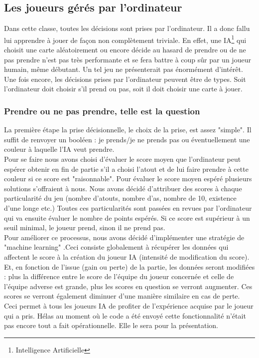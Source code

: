 \documentclass[a4paper,11pt]{article}
\begin{document}
\subsection{Les joueurs gérés par l'ordinateur}
Dans cette classe, toutes les décisions sont prises par l'ordinateur. Il a donc fallu lui apprendre à jouer de façon non complètement triviale. En effet, une IA\footnote{Intelligence Artificielle} qui choisit une carte aléatoirement ou encore décide au hasard de prendre ou de ne pas prendre n'est pas très performante et se fera battre à coup sûr par un joueur humain, même débutant. Un tel jeu ne présenterait pas énormément d'intérêt.\\

Une fois encore, les décisions prises par l'ordinateur peuvent être de types. Soit l'ordinateur doit choisir s'il prend ou pas, soit il doit choisir une carte à jouer. 
\subsubsection{Prendre ou ne pas prendre, telle est la question}
La première étape la prise décisionnelle, le choix de la prise, est assez "simple". Il suffit de renvoyer un booléen : je prends/je ne prends pas ou éventuellement une couleur à laquelle l'IA veut prendre.\\

Pour se faire nous avons choisi d'évaluer le score moyen que l'ordinateur peut espérer obtenir en fin de partie s'il a choisi l'atout et de lui faire prendre à cette couleur si ce score est "raisonnable". Pour évaluer le score moyen espéré plusieurs solutions s'offraient à nous. Nous avons décidé d'attribuer des scores à chaque particularité du jeu (nombre d'atouts, nombre d'as, nombre de 10, existence d'une longe etc.) Toutes ces particularités sont passées en revues par l'ordinateur qui va ensuite évaluer le nombre de points espérés. Si ce score est supérieur à un seuil minimal, le joueur prend, sinon il ne prend pas. \\

Pour améliorer ce processus, nous avons décidé d'implémenter une stratégie de "machine learning" .Ceci consiste globalement à récupérer les données qui affectent le score à la création du joueur IA (intensité de modification du score). Et, en fonction de l'issue (gain ou perte) de la partie, les données seront modifiées : plus la différence entre le score de l'équipe du joueur concernée et celle de l'équipe adverse est grande, plus les scores en question se verront augmenter. Ces scores se verront également diminuer d'une manière similaire en cas de perte. Ceci permet à tous les joueurs IA de profiter de l'expérience acquise par le joueur qui a pris. Hélas au moment où le code a été envoyé cette fonctionnalité n'était pas encore tout a fait opérationnelle. Elle le sera pour la présentation.\\
\end{document}
